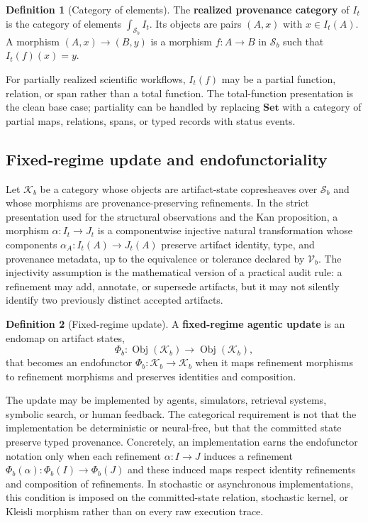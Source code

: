 \documentclass[11pt]{article}
\theoremstyle{definition}
\newtheorem{definition}{Definition}
\newcommand{\K}{\mathcal{K}}
\newcommand{\Sschema}{\mathcal{S}}
\newcommand{\V}{\mathcal{V}}
\newcommand{\Set}{\mathbf{Set}}
\newcommand{\Obj}{\operatorname{Obj}}
\begin{document}
\begin{definition}[Category of elements]
\label{def:elements}
The \textbf{realized provenance category} of $I_t$ is the category of elements $\int_{\Sschema_b}I_t$. Its objects are pairs $(A,x)$ with $x\in I_t(A)$. A morphism $(A,x)\to(B,y)$ is a morphism $f:A\to B$ in $\Sschema_b$ such that $I_t(f)(x)=y$.
\end{definition}

For partially realized scientific workflows, $I_t(f)$ may be a partial function, relation, or span rather than a total function. The total-function presentation is the clean base case; partiality can be handled by replacing $\Set$ with a category of partial maps, relations, spans, or typed records with status events.

\subsection{Fixed-regime update and endofunctoriality}

Let $\K_b$ be a category whose objects are artifact-state copresheaves over $\Sschema_b$ and whose morphisms are provenance-preserving refinements. In the strict presentation used for the structural observations and the Kan proposition, a morphism $\alpha:I_t\to J_t$ is a componentwise injective natural transformation whose components $\alpha_A:I_t(A)\to J_t(A)$ preserve artifact identity, type, and provenance metadata, up to the equivalence or tolerance declared by $\V_b$. The injectivity assumption is the mathematical version of a practical audit rule: a refinement may add, annotate, or supersede artifacts, but it may not silently identify two previously distinct accepted artifacts.

\begin{definition}[Fixed-regime update]
\label{def:fixedupdate}
A \textbf{fixed-regime agentic update} is an endomap on artifact states,
\[
\Phi_b:\Obj(\K_b)\to\Obj(\K_b),
\]
that becomes an endofunctor $\Phi_b:\K_b\to\K_b$ when it maps refinement morphisms to refinement morphisms and preserves identities and composition.
\end{definition}

The update may be implemented by agents, simulators, retrieval systems, symbolic search, or human feedback. The categorical requirement is not that the implementation be deterministic or neural-free, but that the committed state preserve typed provenance. Concretely, an implementation earns the endofunctor notation only when each refinement $\alpha:I\to J$ induces a refinement $\Phi_b(\alpha):\Phi_b(I)\to\Phi_b(J)$ and these induced maps respect identity refinements and composition of refinements. In stochastic or asynchronous implementations, this condition is imposed on the committed-state relation, stochastic kernel, or Kleisli morphism rather than on every raw execution trace.
\end{document}
